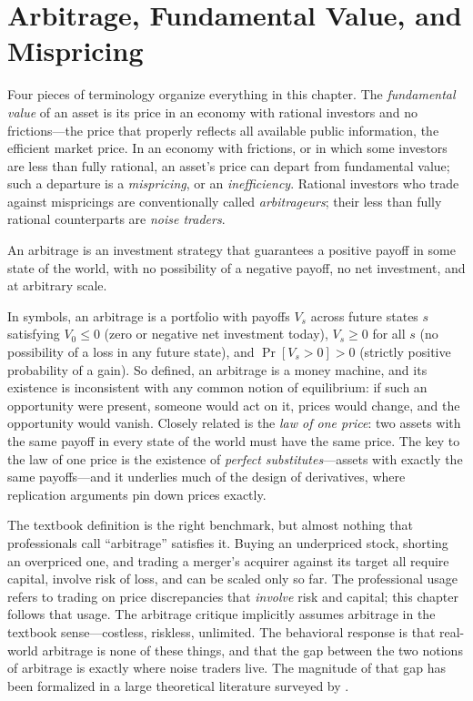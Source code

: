 \section{Arbitrage, Fundamental Value, and Mispricing}
\label{sec:arbdef}

Four pieces of terminology organize everything in this chapter. The \emph{fundamental value} of an asset is its price in an economy with rational investors and no frictions---the price that properly reflects all available public information, the efficient market price. In an economy with frictions, or in which some investors are less than fully rational, an asset's price can depart from fundamental value; such a departure is a \emph{mispricing}, or an \emph{inefficiency}. Rational investors who trade against mispricings are conventionally called \emph{arbitrageurs}; their less than fully rational counterparts are \emph{noise traders}.

\begin{definition}[Arbitrage]
\label{def:arbitrage}
An arbitrage is an investment strategy that guarantees a positive payoff in some state of the world, with no possibility of a negative payoff, no net investment, and at arbitrary scale.
\end{definition}

In symbols, an arbitrage is a portfolio with payoffs $V_s$ across future states $s$ satisfying $V_0 \leq 0$ (zero or negative net investment today), $V_s \geq 0$ for all $s$ (no possibility of a loss in any future state), and $\Pr[V_s > 0] > 0$ (strictly positive probability of a gain). So defined, an arbitrage is a money machine, and its existence is inconsistent with any common notion of equilibrium: if such an opportunity were present, someone would act on it, prices would change, and the opportunity would vanish. Closely related is the \emph{law of one price}: two assets with the same payoff in every state of the world must have the same price. The key to the law of one price is the existence of \emph{perfect substitutes}---assets with exactly the same payoffs---and it underlies much of the design of derivatives, where replication arguments pin down prices exactly.

The textbook definition is the right benchmark, but almost nothing that professionals call ``arbitrage'' satisfies it. Buying an underpriced stock, shorting an overpriced one, and trading a merger's acquirer against its target all require capital, involve risk of loss, and can be scaled only so far. The professional usage refers to trading on price discrepancies that \emph{involve} risk and capital; this chapter follows that usage. The arbitrage critique implicitly assumes arbitrage in the textbook sense---costless, riskless, unlimited. The behavioral response is that real-world arbitrage is none of these things, and that the gap between the two notions of arbitrage is exactly where noise traders live. The magnitude of that gap has been formalized in a large theoretical literature surveyed by \citet{gromb2010}.

